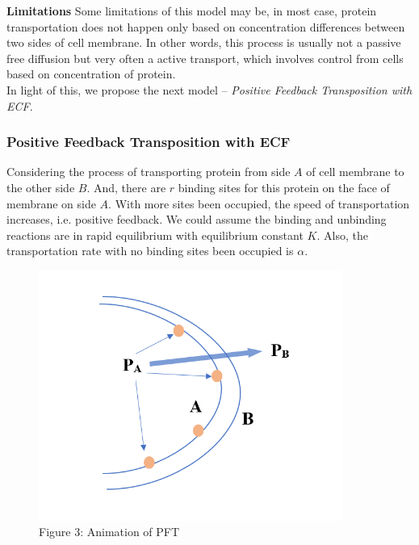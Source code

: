 \documentclass[12pt]{article}
\renewcommand{\(}{\left (}
\renewcommand{\)}{\right )}
\begin{document}
\textbf{Limitations}
Some limitations of this model may be, in most case, protein transportation does not happen only based on concentration differences between two sides of cell membrane. In other words, this process is usually not a passive free diffusion but very often a active transport, which involves control from cells based on concentration of protein. \\

In light of this, we propose the next model -- \textit{Positive Feedback Transposition with ECF}.

\subsubsection{Positive Feedback Transposition with ECF}
\hspace{5mm} Considering the process of transporting protein from side $A$ of cell membrane to the other side $B$. And, there are $r$ binding sites for this protein on the face of membrane on side $A$. With more sites been occupied, the speed of transportation increases, i.e. positive feedback. We could assume the binding and unbinding reactions are in rapid equilibrium with equilibrium constant $K$. Also, the transportation rate with no binding sites been occupied is $\alpha$.

\begin{figure} [h]
    \centering
	\begin{minipage}{0.45\textwidth}
		\centering
		\includegraphics[width=0.89\textwidth]{PFAn.png}
		\caption*{\small Figure 3: Animation of PFT}
	\end{minipage}

\end{figure}
\end{document}
